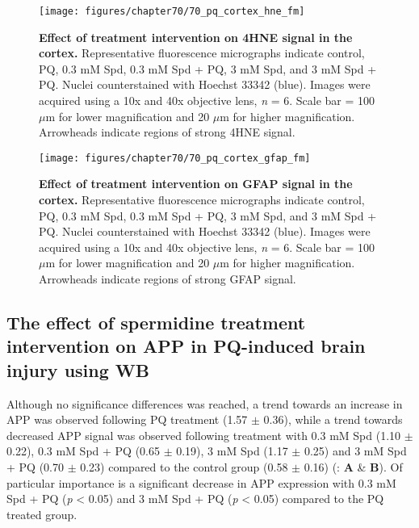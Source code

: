 \begin{landscape}
\begin{figure}[!htbp]
\center
  \texttt{[image: figures/chapter70/70\_pq\_cortex\_hne\_fm]}
  \caption[Effect of treatment intervention on 4HNE signal in the cortex]{\textbf{Effect of treatment intervention on 4HNE signal in the cortex.} Representative fluorescence micrographs indicate control, PQ, 0.3 mM Spd, 0.3 mM Spd + PQ, 3 mM Spd, and 3 mM Spd + PQ. Nuclei counterstained with Hoechst 33342 (blue). Images were acquired using a 10x and 40x objective lens, \textit{n} = 6. Scale bar = 100 $\mu$m for lower magnification and 20 $\mu$m for higher magnification. Arrowheads indicate regions of strong 4HNE signal.}
  \label{fig:70_pq_cortex_hne_fm}
\end{figure} 
\end{landscape}

\begin{landscape}
\begin{figure}[!htbp]
\center
  \texttt{[image: figures/chapter70/70\_pq\_cortex\_gfap\_fm]}
  \caption[Effect of treatment intervention on GFAP signal in the cortex]{\textbf{Effect of treatment intervention on GFAP signal in the cortex.} Representative fluorescence micrographs indicate control, PQ, 0.3 mM Spd, 0.3 mM Spd + PQ, 3 mM Spd, and 3 mM Spd + PQ. Nuclei counterstained with Hoechst 33342 (blue). Images were acquired using a 10x and 40x objective lens, \textit{n} = 6. Scale bar = 100 $\mu$m for lower magnification and 20 $\mu$m for higher magnification. Arrowheads indicate regions of strong GFAP signal.}
  \label{fig:70_pq_cortex_gfap_fm}
\end{figure} 
\end{landscape}

\subsection{The effect of spermidine treatment intervention on APP in PQ-induced brain injury using WB}
Although no significance differences was reached, a trend towards an increase in APP was observed following PQ treatment (1.57 $\pm$ 0.36), while a trend towards decreased APP signal was observed following treatment with 0.3 mM Spd (1.10 $\pm$ 0.22), 0.3 mM Spd + PQ (0.65 $\pm$ 0.19), 3 mM Spd (1.17 $\pm$ 0.25) and 3 mM Spd + PQ (0.70 $\pm$ 0.23) compared to the control group (0.58 $\pm$ 0.16)  (: \textbf{A} \& \textbf{B}). Of particular importance is a significant decrease in APP expression with 0.3 mM Spd + PQ (\textit{p} < 0.05) and 3 mM Spd + PQ (\textit{p} < 0.05) compared to the PQ treated group. 

